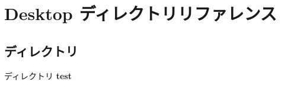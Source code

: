 \section{Desktop ディレクトリリファレンス}
\label{dir_e04ae2849dfa520b4ee2c9f7e9ff15de}
\subsection*{ディレクトリ}
\begin{DoxyCompactItemize}
\item 
ディレクトリ {\bf test}
\end{DoxyCompactItemize}
